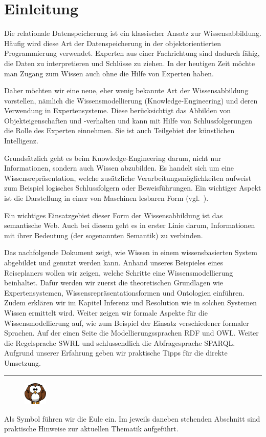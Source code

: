 \chapter{Einleitung}
\label{chap:einleitung}
Die relationale Datenspeicherung ist ein klassischer Ansatz zur Wissensabbildung. Häufig wird diese Art der Datenspeicherung in der objektorientierten Programmierung verwendet. Experten aus einer Fachrichtung sind dadurch fähig, die Daten zu interpretieren und Schlüsse zu ziehen. In der heutigen Zeit möchte man Zugang zum Wissen auch ohne die Hilfe von Experten haben. 

Daher möchten wir eine neue, eher wenig bekannte Art der Wissensabbildung vorstellen, nämlich die Wissensmodellierung (Knowledge-Engineering) und deren Verwendung in Expertensysteme. Diese berücksichtigt das Abbilden von Objekteigenschaften und -verhalten und kann mit Hilfe von Schlussfolgerungen die Rolle des Experten einnehmen. Sie ist auch Teilgebiet der künstlichen Intelligenz.

Grundsätzlich geht es beim Knowledge-Engineering darum, nicht nur Informationen, sondern auch Wissen abzubilden. Es handelt sich um eine Wissensrepräsentation, welche zusätzliche Verarbeitungsmöglichkeiten aufweist zum Beispiel logisches Schlussfolgern oder Beweisführungen. Ein wichtiger Aspekt ist die Darstellung in einer von Maschinen lesbaren Form (vgl.~\cite[S. 308]{ISpekOntoGeschichte}).

Ein wichtiges Einsatzgebiet dieser Form der Wissensabbildung ist das semantische Web. Auch bei diesem geht es in erster Linie darum, Informationen mit ihrer Bedeutung (der sogenannten Semantik) zu verbinden.

Das nachfolgende Dokument zeigt, wie Wissen in einem wissensbasierten System abgebildet und genutzt werden kann. Anhand unseres Beispieles eines Reiseplaners wollen wir zeigen, welche Schritte eine Wissensmodellierung beinhaltet. Dafür werden wir zuerst die theoretischen Grundlagen wie Expertensystemen, Wissensrepräsentationsformen und Ontologien einführen. Zudem erklären wir im Kapitel Inferenz und Resolution wie in solchen Systemen Wissen ermittelt wird. Weiter zeigen wir formale Aspekte für die Wissensmodellierung auf, wie zum Beispiel der Einsatz verschiedener formaler Sprachen. Auf der einen Seite die Modellierungssprachen RDF und OWL. Weiter die Regelsprache SWRL und schlussendlich die Abfragesprache SPARQL. Aufgrund unserer Erfahrung geben wir praktische Tipps für die direkte Umsetzung.

\noindent\rule[1ex]{\textwidth}{1pt}
\begin{figure}
    \vspace{-12pt}
    \includegraphics[width=0.1\textwidth]{bilder/owl.png}\protect\footnotemark{}
\end{figure}
Als Symbol führen wir die Eule ein. Im jeweils daneben stehenden Abschnitt sind praktische Hinweise zur aktuellen Thematik aufgeführt.

